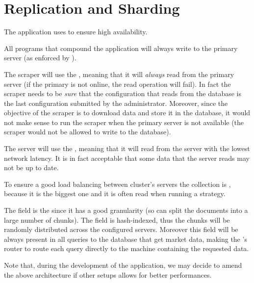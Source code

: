 \section{Replication and Sharding}\label{sec:distributed}

The application uses  to ensure high availability.

All programs that compound the application will always write to the primary
server (as enforced by \mongodb).

The scraper will use the  ,
meaning that it will \emph{always} read from the primary server (if the primary
is not online, the read operation will fail). In fact the scraper needs to be
\emph{sure} that the configuration that reads from the database is the last
configuration submitted by the administrator. Moreover, since the objective of
the scraper is to download data and store it in the database, it would not make
sense to run the scraper when the primary server is not available (the scraper
would not be allowed to write to the database).

The server will use the  ,
meaning that it will read from the server with the lowest network latency. It is
in fact acceptable that some data that the server reads may not be up to date.

To ensure a good load balancing between cluster's servers the
 collection is , because it is the biggest
one and it is often read when running a strategy.

The  field is the  since it has a good
granularity (so \mongodb{} can split the documents into a large number of
chunks). The field is hash-indexed, thus the chunks will be randomly distributed
across the configured servers. Moreover this field will be always present in all
queries to the database that get market data, making the \mongodb's router to
route each query directly to the machine containing the requested data.

Note that, during the development of the application, we may decide to amend the
above architecture if other setups allows for better performances.
